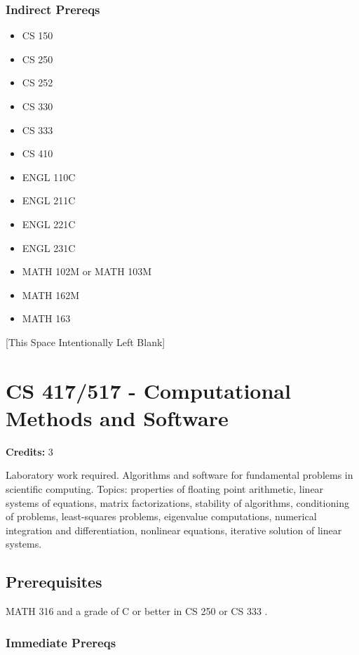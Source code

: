\documentclass[]{article}
\providecommand{\tightlist}{%
  \setlength{\itemsep}{0pt}\setlength{\parskip}{0pt}}
\newcommand{\pagebreakhere}{
\vspace*{\fill}
\begin{center}
[This Space Intentionally Left Blank]
\end{center}
\vspace*{\fill}
\newpage
}
\begin{document}
\subsubsection{Indirect Prereqs}\label{indirect-prereqs-19}

\begin{itemize}
\tightlist
\item
  CS 150
\item
  CS 250
\item
  CS 252
\item
  CS 330
\item
  CS 333
\item
  CS 410
\item
  ENGL 110C
\item
  ENGL 211C
\item
  ENGL 221C
\item
  ENGL 231C
\item
  MATH 102M or MATH 103M
\item
  MATH 162M
\item
  MATH 163
\end{itemize}

\pagebreakhere
\section{CS 417/517 - Computational Methods and
Software}\label{cs-417517---computational-methods-and-software}

\textbf{Credits:} 3

Laboratory work required. Algorithms and software for fundamental
problems in scientific computing. Topics: properties of floating point
arithmetic, linear systems of equations, matrix factorizations,
stability of algorithms, conditioning of problems, least-squares
problems, eigenvalue computations, numerical integration and
differentiation, nonlinear equations, iterative solution of linear
systems.

\subsection{Prerequisites}\label{prerequisites-28}

MATH 316 and a grade of C or better in CS 250 or CS 333 .

\subsubsection{Immediate Prereqs}\label{immediate-prereqs-20}
\end{document}
